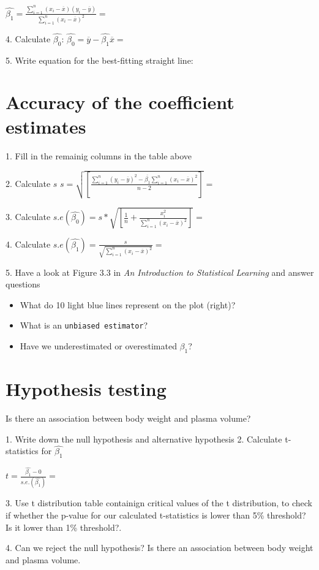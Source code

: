 \documentclass[12pt]{article}\usepackage[]{graphicx}\usepackage[]{color}
\begin{document}
$\hat{\beta_1}= \frac{\sum_{i=1}^{n}(x_i-\overline{x})(y_i-\overline{y})}{\sum_{i=1}^{n}(x_i-\overline{x})^2}=$ \newline
\vspace{0.5cm}

4. Calculate $\hat{\beta_0}$: \newline
\vspace{0.1cm} 
$\hat{\beta_0}=\overline{y}-\hat{\beta_1}\overline{x}=$ \newline

5. Write equation for the best-fitting straight line:



\section{Accuracy of the coefficient estimates}

1. Fill in the remainig columns in the table above
\vspace{1cm} 

2. Calculate $s$
$s=\sqrt{[\frac{\sum_{i=1}^{n}(y_i-\overline{y})^2-\overline{\beta_1}\sum_{i=1}^{n}(x_i-\overline{x})^2}{n-2}]}=$
\vspace{1cm} 

3. Calculate 
$s.e(\hat{\beta_0})=s*\sqrt{[\frac{1}{n}+\frac{x_i^2}{\sum_{i=1}^{n}(x_i-\overline{x})^2}]}=$
\vspace{1cm} 

4. Calculate
$s.e(\hat{\beta_1})=\frac{s}{\sqrt{\sum_{i=1}^{n}(x_i-\overline{x})^2}}=$
\vspace{0.2cm} 

5. Have a look at Figure 3.3 in \textit{An Introduction to Statistical Learning} and answer questions
\begin{itemize}
  \item What do 10 light blue lines represent on the plot (right)?
  \item What is an \texttt{unbiased estimator}?
  \item Have we underestimated or overestimated ${\beta_1}$?
\end{itemize}

\section{Hypothesis testing}
Is there an association between body weight and plasma volume? 

1. Write down the null hypothesis and alternative hypothesis
2. Calculate t-statistics for $\hat{\beta_1}$ \newline

$t=\frac{\hat{\beta_1}-0}{s.e.(\hat{\beta_1})} = $
\vspace{0.2cm}

3. Use t distribution table containign critical values of the t distribution, to check if whether the p-value for our calculated t-statistics is lower than 5\% threshold? Is it lower than 1\% threshold?.

4. Can we reject the null hypothesis? Is there an association between body weight and plasma volume. 
\end{document}
